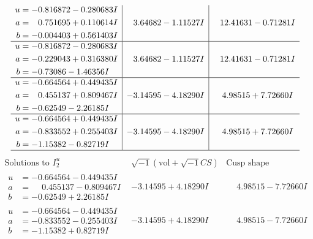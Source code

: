 \documentclass[1p]{elsarticle_modified}
\theoremstyle{definition}
\newcommand{\I}{\sqrt{-1}}
\begin{document}
$$\begin{array}{c|c|c}
\begin{aligned}
u &= -0.816872 - 0.280683 I \\
a &= \phantom{-}0.751695 + 0.110614 I \\
b &= -0.004403 + 0.561403 I\end{aligned}
 & \phantom{-}3.64682 - 1.11527 I & \phantom{-}12.41631 - 0.71281 I \\ \hline\begin{aligned}
u &= -0.816872 - 0.280683 I \\
a &= -0.229043 + 0.316380 I \\
b &= -0.73086 - 1.46356 I\end{aligned}
 & \phantom{-}3.64682 - 1.11527 I & \phantom{-}12.41631 - 0.71281 I \\ \hline\begin{aligned}
u &= -0.664564 + 0.449435 I \\
a &= \phantom{-}0.455137 + 0.809467 I \\
b &= -0.62549 - 2.26185 I\end{aligned}
 & -3.14595 - 4.18290 I & \phantom{-}4.98515 + 7.72660 I \\ \hline\begin{aligned}
u &= -0.664564 + 0.449435 I \\
a &= -0.833552 + 0.255403 I \\
b &= -1.15382 - 0.82719 I\end{aligned}
 & -3.14595 - 4.18290 I & \phantom{-}4.98515 + 7.72660 I\\
 \hline 
 \end{array}$$\newpage$$\begin{array}{c|c|c}  
\text{Solutions to }I^u_{2}& \I (\text{vol} + \sqrt{-1}CS) & \text{Cusp shape}\\
 \hline 
\begin{aligned}
u &= -0.664564 - 0.449435 I \\
a &= \phantom{-}0.455137 - 0.809467 I \\
b &= -0.62549 + 2.26185 I\end{aligned}
 & -3.14595 + 4.18290 I & \phantom{-}4.98515 - 7.72660 I \\ \hline\begin{aligned}
u &= -0.664564 - 0.449435 I \\
a &= -0.833552 - 0.255403 I \\
b &= -1.15382 + 0.82719 I\end{aligned}
 & -3.14595 + 4.18290 I & \phantom{-}4.98515 - 7.72660 I \\ \hline\begin{aligned}

\end{aligned}
\end{array}$$
\end{document}
